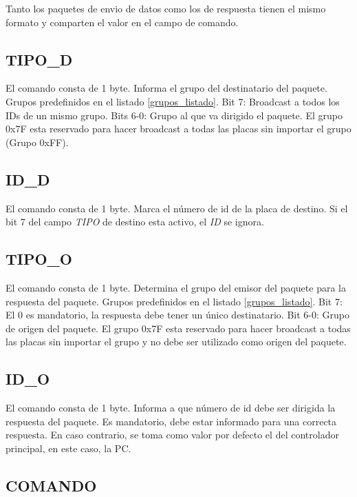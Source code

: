 \documentclass[a4paper,10pt]{article}
\begin{document}
Tanto los paquetes de envio de datos como los de respuesta tienen el mismo formato y comparten el valor en el campo de comando.

\subsection{TIPO\_D}
\label{tipo_destinatario}

	El comando consta de 1 byte.
	Informa el grupo del destinatario del paquete.
	Grupos predefinidos en el listado \ref{grupos_listado}.
	Bit 7: Broadcast a todos los IDs de un mismo grupo.
	Bits 6-0: Grupo al que va dirigido el paquete. El grupo 0x7F esta reservado para hacer broadcast a todas las placas sin importar el grupo (Grupo 0xFF).

\subsection{ID\_D}
\label{id_destinatario}

	El comando consta de 1 byte.
	Marca el n\'umero de id de la placa de destino.
	Si el bit 7 del campo \emph{TIPO} de destino esta activo, el \emph{ID} se ignora.

\subsection{TIPO\_O}
\label{tipo_emisor}

	El comando consta de 1 byte.
	Determina el grupo del emisor del paquete para la respuesta del paquete.
	Grupos predefinidos en el listado \ref{grupos_listado}.
	Bit 7: El 0 es mandatorio, la respuesta debe tener un \'unico destinatario.
	Bit 6-0: Grupo de origen del paquete.
	El grupo 0x7F esta reservado para hacer broadcast a todas las placas sin importar el grupo y no debe ser utilizado como origen del paquete.

\subsection{ID\_O}
\label{id_emisor}

	El comando consta de 1 byte.
	Informa a que n\'umero de id debe ser dirigida la respuesta del paquete.
	Es mandatorio, debe estar informado para una correcta respuesta.
	En caso contrario, se toma como valor por defecto el del controlador principal, en este caso, la PC.
		
\subsection{COMANDO}
\label{comando}
\end{document}
